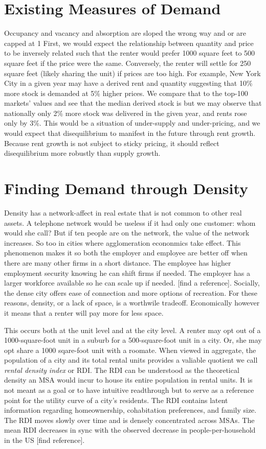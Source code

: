 \documentclass[sn-mathphys-num]{sn-jnl}%
\theoremstyle{thmstyleone}%
\theoremstyle{thmstyletwo}%
\theoremstyle{thmstylethree}%
\begin{document}
\section{Existing Measures of Demand}
Occupancy and vacancy and absorption are sloped the wrong way and or 
are capped at 1
First, we would expect the relationship between quantity and price to be inversely related such that the renter would prefer 1000 square feet to 500 square feet if the price were the same. Conversely,  the renter will settle for 250 square feet (likely sharing the unit) if prices are too high. 
For example, New York City in a given year may have a derived rent and quantity suggesting that 10\% more stock is demanded at 5\% higher prices. We compare that to the top-100 markets' values and see that the median derived stock is  but we may observe that nationally only 2\% more stock was delivered in the given year, and rents rose only by 3\%. This would be a situation of under-supply and under-pricing, and we would expect that disequilibrium to manifest in the future through rent growth. Because rent growth is not subject to sticky pricing, it should reflect disequilibrium more robustly than supply growth.

\section{Finding Demand through Density}
Density has a network-affect in real estate that is not common to other real assets. A telephone network would be useless if it had only one customer: whom would she call? But if ten people are on the network, the value of the network increases. So too in cities where agglomeration econonmics take effect. This phenomenon makes it so both the employer and employee are better off when there are many other firms in a short distance. The employee has higher employment security knowing he can shift firms if needed. The employer has a larger workforce available so he can scale up if needed. [find a reference]. Socially, the dense city offers ease of connection and more options of recreation. For these reasons, density, or a lack of space, is a worthwile tradeoff. Economically however it means that a renter will pay more for less space.

This occurs both at the unit level and at the city level. A renter may opt out of a 1000-square-foot unit in a suburb for a 500-square-foot unit in a city. Or, she may opt share a 1000 sqare-foot unit with a roomate. When viewed in aggregate, the population of a city and its total rental units provides a valiable quotient we call \textit{rental density index} or RDI. The RDI can be understood as the theoretical density an MSA would incur to house its entire population in rental units. It is not meant as a goal or to have intuitive readthrough but to serve as a reference point for the utility curve of a city's residents. 
The RDI contains latent information regarding homeownership, cohabitation preferences, and family size. The RDI moves slowly over time and is densely concentrated across MSAs. The mean RDI decreases in sync with the observed decrease in people-per-household in the US [find reference].
\end{document}

